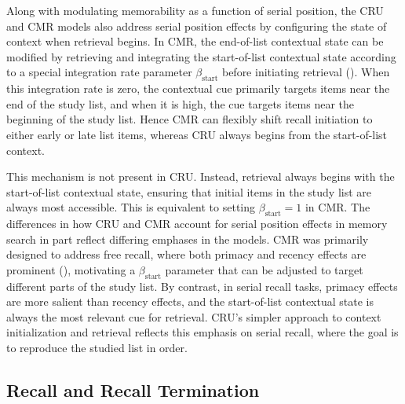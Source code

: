 \documentclass[
  man,
  floatsintext,
  longtable,
  nolmodern,
  notxfonts,
  notimes,
  draftfirst,
  colorlinks=true,linkcolor=blue,citecolor=blue,urlcolor=blue]{apa7}
\begin{document}
Along with modulating memorability as a function of serial position, the
CRU and CMR models also address serial position effects by configuring
the state of context when retrieval begins. In CMR, the end-of-list
contextual state can be modified by retrieving and integrating the
start-of-list contextual state according to a special integration rate
parameter \(\beta_\text{start}\) before initiating retrieval
(). When this
integration rate is zero, the contextual cue primarily targets items
near the end of the study list, and when it is high, the cue targets
items near the beginning of the study list. Hence CMR can flexibly shift
recall initiation to either early or late list items, whereas CRU always
begins from the start-of-list context.

This mechanism is not present in CRU. Instead, retrieval always begins
with the start-of-list contextual state, ensuring that initial items in
the study list are always most accessible. This is equivalent to setting
\(\beta_\text{start} = 1\) in CMR. The differences in how CRU and CMR
account for serial position effects in memory search in part reflect
differing emphases in the models. CMR was primarily designed to address
free recall, where both primacy and recency effects are prominent
(), motivating a
\(\beta_\text{start}\) parameter that can be adjusted to target
different parts of the study list. By contrast, in serial recall tasks,
primacy effects are more salient than recency effects, and the
start-of-list contextual state is always the most relevant cue for
retrieval. CRU's simpler approach to context initialization and
retrieval reflects this emphasis on serial recall, where the goal is to
reproduce the studied list in order.

\subsection{Recall and Recall
Termination}\label{recall-and-recall-termination}
\end{document}
